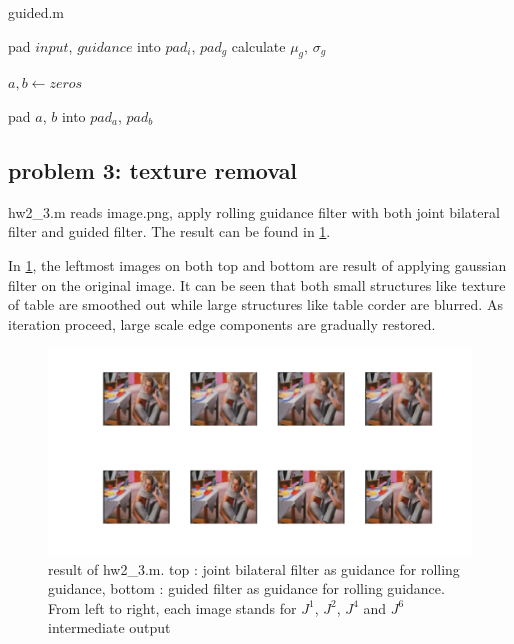 \documentclass[extendedabs]{bmvc2k}
\begin{document}
\begin{algorithm}
    \caption{guided.m}
    pad $input$, $guidance$ into $pad_{i}$, $pad_{g}$\;
    calculate $\mu_{g}$, $\sigma_{g}$\;

    $a, b \gets zeros$\;
    
    pad $a$, $b$ into $pad_{a}$, $pad_{b}$\;
\end{algorithm}

\subsection*{problem 3: texture removal}

hw2\_3.m reads image.png, apply rolling guidance filter with both joint bilateral filter
and guided filter. The result can be found in \figurename{\ref{fig:10}}.

In \figurename{\ref{fig:10}}, the leftmost images on both top and bottom are result of 
applying gaussian filter on the original image. It can be seen that both small structures like
texture of table are smoothed out while large structures like table corder are
blurred. As iteration proceed, large scale edge components are gradually restored.

\begin{figure}[h]
    \centering
    \includegraphics[width=\linewidth]{hw2_3_1}
    \caption{result of hw2\_3.m. top : joint bilateral filter as guidance for
    rolling guidance, bottom : guided filter as guidance for rolling guidance.
    From left to right, each image stands for $J^1$, $J^2$, $J^4$ and $J^6$
    intermediate output}
    \label{fig:10}
\end{figure}
\end{document}
